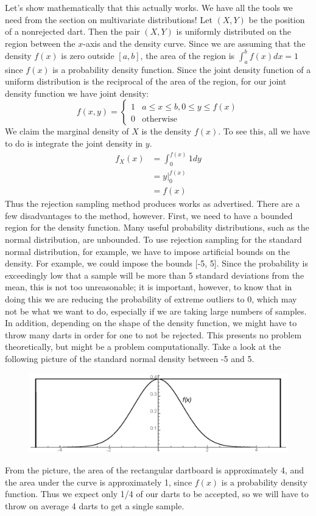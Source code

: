 \documentclass[12pt]{article}
\theoremstyle{definition}
\theoremstyle{remark}
\begin{document}
Let's show mathematically that this actually works. We have all the tools we need from the section on multivariate distributions! Let $(X, Y)$ be the position of a nonrejected dart. Then the pair $(X, Y)$ is uniformly distributed on the region between the $x$-axis and the density curve. Since we are assuming that the density $f(x)$ is zero outside $[a, b]$, the area of the region is $\int_a^b f(x) dx = 1$ since $f(x)$ is a probability density function. Since the joint density function of a uniform distribution is the reciprocal of the area of the region, for our joint density function we have joint density:
\[
f(x, y) = \begin{cases}
1 & a \leq x \leq b, 0 \leq y \leq f(x) \\
0 & \text{otherwise}
\end{cases}
\]
We claim the marginal density of $X$ is the density $f(x)$. To see this, all we have to do is integrate the joint density in $y$.
\begin{align*}
f_X(x) &= \int_0^{f(x)} 1 dy \\
&= y\Bigr|_0^{f(x)} \\
&= f(x)
\end{align*}
Thus the rejection sampling method produces works as advertised. There are a few disadvantages to the method, however. First, we need to have a bounded region for the density function. Many useful probability distributions, such as the normal distribution, are unbounded. To use rejection sampling for the standard normal distribution, for example, we have to impose artificial bounds on the density. For example, we could impose the bounds [-5, 5]. Since the probability is exceedingly low that a sample will be more than 5 standard deviations from the mean, this is not too unreasonable; it is important, however, to know that in doing this we are reducing the probability of extreme outliers to 0, which may not be what we want to do, especially if we are taking large numbers of samples. In addition, depending on the shape of the density function, we might have to throw many darts in order for one to not be rejected. This presents no problem theoretically, but might be a problem computationally. Take a look at the following picture of the standard normal density between -5 and 5.
\begin{figure}[H]
\centering
\includegraphics[width=12cm]{rejection2.eps}
\end{figure}
From the picture, the area of the rectangular dartboard is approximately 4, and the area under the curve is approximately 1, since $f(x)$ is a probability density function. Thus we expect only 1/4 of our darts to be accepted, so we will have to throw on average 4 darts to get a single sample.\\
\end{document}
